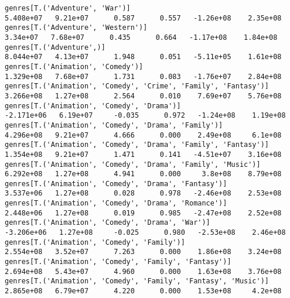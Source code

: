 \documentclass[11pt]{article}
\begin{document}
\begin{Verbatim}[commandchars=\\\{\}]
genres[T.('Adventure', 'War')]                                                                                5.408e+07   9.21e+07      0.587      0.557   -1.26e+08    2.35e+08
genres[T.('Adventure', 'Western')]                                                                             3.34e+07   7.68e+07      0.435      0.664   -1.17e+08    1.84e+08
genres[T.('Adventure',)]                                                                                      8.044e+07   4.13e+07      1.948      0.051   -5.11e+05    1.61e+08
genres[T.('Animation', 'Comedy')]                                                                             1.329e+08   7.68e+07      1.731      0.083   -1.76e+07    2.84e+08
genres[T.('Animation', 'Comedy', 'Crime', 'Family', 'Fantasy')]                                               3.266e+08   1.27e+08      2.564      0.010    7.69e+07    5.76e+08
genres[T.('Animation', 'Comedy', 'Drama')]                                                                   -2.171e+06   6.19e+07     -0.035      0.972   -1.24e+08    1.19e+08
genres[T.('Animation', 'Comedy', 'Drama', 'Family')]                                                          4.296e+08   9.21e+07      4.666      0.000    2.49e+08     6.1e+08
genres[T.('Animation', 'Comedy', 'Drama', 'Family', 'Fantasy')]                                               1.354e+08   9.21e+07      1.471      0.141   -4.51e+07    3.16e+08
genres[T.('Animation', 'Comedy', 'Drama', 'Family', 'Music')]                                                 6.292e+08   1.27e+08      4.941      0.000     3.8e+08    8.79e+08
genres[T.('Animation', 'Comedy', 'Drama', 'Fantasy')]                                                         3.537e+06   1.27e+08      0.028      0.978   -2.46e+08    2.53e+08
genres[T.('Animation', 'Comedy', 'Drama', 'Romance')]                                                         2.448e+06   1.27e+08      0.019      0.985   -2.47e+08    2.52e+08
genres[T.('Animation', 'Comedy', 'Drama', 'War')]                                                            -3.206e+06   1.27e+08     -0.025      0.980   -2.53e+08    2.46e+08
genres[T.('Animation', 'Comedy', 'Family')]                                                                   2.554e+08   3.52e+07      7.263      0.000    1.86e+08    3.24e+08
genres[T.('Animation', 'Comedy', 'Family', 'Fantasy')]                                                        2.694e+08   5.43e+07      4.960      0.000    1.63e+08    3.76e+08
genres[T.('Animation', 'Comedy', 'Family', 'Fantasy', 'Music')]                                               2.865e+08   6.79e+07      4.220      0.000    1.53e+08     4.2e+08

\end{Verbatim}
\end{document}
